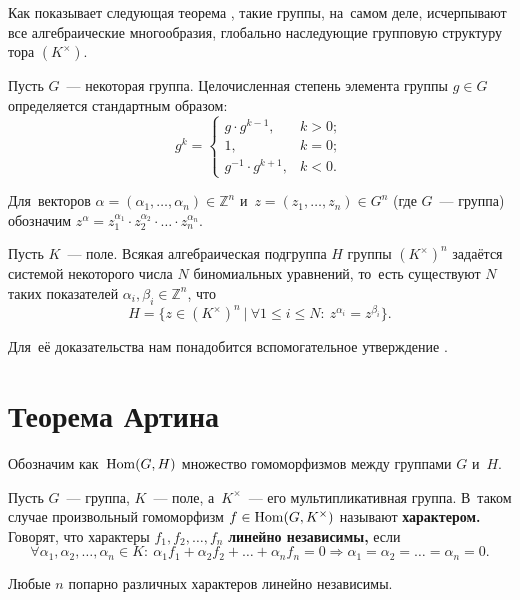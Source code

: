 \documentclass[a4paper,oneside]{article}
\begin{document}
Как показывает следующая теорема \cite{Schm94}, такие группы, на~самом деле, исчерпывают все алгебраические многообразия,
глобально наследующие групповую структуру тора $(K^\times)$.

Пусть $G$~— некоторая группа. Целочисленная степень элемента группы $g \in G$ определяется стандартным образом:
$$
  g^k =
  \begin{cases}
    g \cdot g^{k - 1}, & k > 0; \\
    1, & k = 0; \\
    g^{-1} \cdot g^{k + 1}, & k < 0.
  \end{cases}
$$

Для~векторов $\alpha = (\alpha_1, \ldots, \alpha_n) \in \mathbb{Z}^n$ и~$z = (z_1, \ldots, z_n) \in G^n$ (где $G$~— группа)
обозначим $z^\alpha = z_1^{\alpha_1} \cdot z_2^{\alpha_2} \cdot \ldots \cdot z_n^{\alpha_n}$.

\begin{theorem*}[Шмидт]
    Пусть $K$~— поле. Всякая алгебраическая подгруппа $H$ группы $(K^{\times})^n$ задаётся
    системой некоторого числа $N$ биномиальных уравнений, то~есть существуют $N$ таких показателей $\alpha_i, \beta_i \in \mathbb{Z}^n$, что
    $$
        H = \{ z \in (K^{\times})^n\ |\ \forall 1 \leq i \leq N{:}\ z^{\alpha_i} = z^{\beta_i} \}.
    $$
\end{theorem*}

Для~её доказательства нам понадобится вспомогательное утверждение \cite{Art48}.

\section{Теорема Артина}

Обозначим как~$\mathrm{Hom}(G, H)$ множество гомоморфизмов между группами $G$ и~$H$.

Пусть $G$~— группа, $K$~— поле, а~$K^{\times}$~— его мультипликативная группа.
В~таком случае произвольный гомоморфизм $f \in \mathrm{Hom}(G, K^{\times})$ называют \textbf{характером.}
Говорят, что характеры $f_1, f_2, \ldots, f_n$ \textbf{линейно независимы,}
если
$$
    \forall \alpha_1, \alpha_2, \ldots, \alpha_n \in K{:}\ \alpha_1 f_1 + \alpha_2 f_2 + \ldots + \alpha_n f_n = 0 \Rightarrow \alpha_1 = \alpha_2 = \ldots = \alpha_n = 0.
$$

\begin{theorem*}[Артин]
    Любые $n$ попарно различных характеров линейно независимы.
\end{theorem*}
\end{document}
